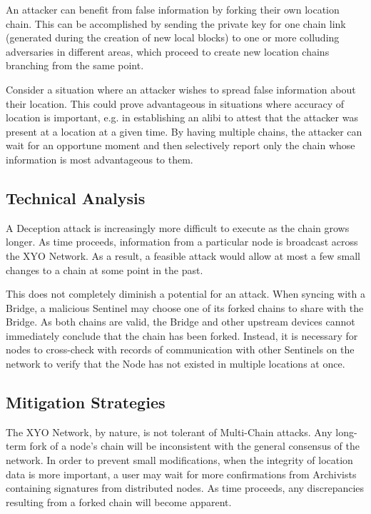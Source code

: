 \documentclass{article}
\begin{document}
An attacker can benefit from false information by forking their own location chain. This can be accomplished by sending the private key for one chain link (generated during the creation of new local blocks) to one or more colluding adversaries in different areas, which proceed to create new location chains branching from the same point.

Consider a situation where an attacker wishes to spread false information about their location. This could prove advantageous in situations where accuracy of location is important, e.g. in establishing an alibi to attest that the attacker was present at a location at a given time. By having multiple chains, the attacker can wait for an opportune moment and then selectively report only the chain whose information is most advantageous to them.

\subsection{Technical Analysis}

A Deception attack is increasingly more difficult to execute as the chain grows longer. As time proceeds, information from a particular node is broadcast across the XYO Network. As a result, a feasible attack would allow at most a few small changes to a chain at some point in the past.

This does not completely diminish a potential for an attack. When syncing with a Bridge, a malicious Sentinel may choose one of its forked chains to share with the Bridge. As both chains are valid, the Bridge and other upstream devices cannot immediately conclude that the chain has been forked. Instead, it is necessary for nodes to cross-check with records of communication with other Sentinels on the network to verify that the Node has not existed in multiple locations at once.

\subsection{Mitigation Strategies}

The XYO Network, by nature, is not tolerant of Multi-Chain attacks. Any long-term fork of a node's chain will be inconsistent with the general consensus of the network. In order to prevent small modifications, when the integrity of location data is more important, a user may wait for more confirmations from Archivists containing signatures from distributed nodes. As time proceeds, any discrepancies resulting from a forked chain will become apparent.
\end{document}
